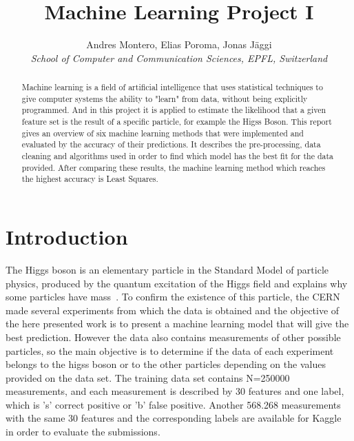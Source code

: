 \documentclass[10pt,conference,compsocconf]{IEEEtran}
\begin{document}
\title{Machine Learning Project I}

\author{
  Andres Montero, Elias Poroma, Jonas J\"aggi\\
  \textit{School of Computer and Communication Sciences, EPFL, Switzerland}
}

\maketitle

\begin{abstract}
  Machine learning is a field of artificial intelligence that uses statistical 
  techniques to give computer systems the ability to "learn" from data, 
  without being explicitly programmed. And in this project it is applied 
  to estimate the likelihood that a given feature set is the result of a
  specific particle, for example the Higss Boson.
  This report gives an overview of six machine learning methods that were implemented
  and evaluated by the accuracy of their predictions. It describes 
  the pre-processing, data cleaning and algorithms used in order to find which
  model has the best fit for the data provided. After comparing these results,
  the machine learning method which reaches the highest accuracy is Least Squares.

\end{abstract}

\section{Introduction}

The Higgs boson is an elementary particle in the Standard Model of 
particle physics, produced by the quantum excitation of the Higgs field
and explains why some particles have mass~\cite{wiki01}. To confirm 
the existence of this particle, the CERN made several experiments from 
which the data is obtained and the objective of the here presented work is to present 
a machine learning model that will give the best prediction. However 
the data also contains measurements of other possible particles, so the main 
objective is to determine if the data of each experiment belongs to 
the higss boson or to the other particles depending on the values provided
on the data set. The training data set contains N=250000 measurements, and each measurement
is described by 30 features and one label, which is 's' correct positive
or 'b' false positive. Another 568.268 measurements with
the same 30 features and the corresponding labels are available for Kaggle~\cite{kaggle01} in order to evaluate the submissions.
\end{document}
